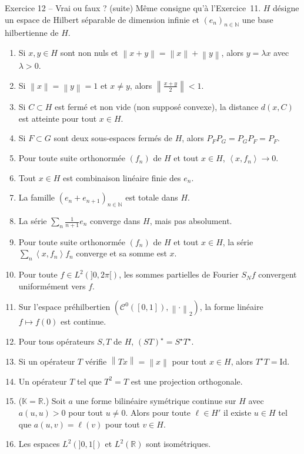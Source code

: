 \documentclass[11pt,a4paper]{article}
\newcommand{\R}{\mathbb{R}}
\newcommand{\N}{\mathbb{N}}
\newcommand{\K}{\mathbb{K}}
\newcommand{\norm}[1]{\left\|#1\right\|}
\newcommand{\ps}[2]{\left\langle #1,#2\right\rangle}
\newcommand{\Cz}{\mathcal{C}^0}
\theoremstyle{definition}
\begin{document}
\begin{exo}{Exercice 12 -- Vrai ou faux ? (suite)}
Même consigne qu'à l'Exercice~11. $H$ désigne un espace de Hilbert séparable de dimension infinie et $(e_n)_{n\in\N}$ une base hilbertienne de $H$.
\begin{enumerate}[label=\arabic*.]
  \item Si $x,y\in H$ sont non nuls et $\norm{x+y}=\norm x+\norm y$, alors $y=\lambda x$ avec $\lambda>0$.
  \item Si $\norm x=\norm y=1$ et $x\ne y$, alors $\norm{\frac{x+y}2}<1$.
  \item Si $C\subset H$ est fermé et non vide (non supposé convexe), la distance $d(x,C)$ est atteinte pour tout $x\in H$.
  \item Si $F\subset G$ sont deux sous-espaces fermés de $H$, alors $P_FP_G=P_GP_F=P_F$.
  \item Pour toute suite orthonormée $(f_n)$ de $H$ et tout $x\in H$, $\ps x{f_n}\to0$.
  \item Tout $x\in H$ est combinaison linéaire finie des $e_n$.
  \item La famille $(e_n+e_{n+1})_{n\in\N}$ est totale dans $H$.
  \item La série $\sum_n\frac1{n+1}e_n$ converge dans $H$, mais pas absolument.
  \item Pour toute suite orthonormée $(f_n)$ de $H$ et tout $x\in H$, la série $\sum_n\ps x{f_n}f_n$ converge et sa somme est $x$.
  \item Pour toute $f\in L^2(]0,2\pi[)$, les sommes partielles de Fourier $S_Nf$ convergent uniformément vers $f$.
  \item Sur l'espace préhilbertien $(\Cz([0,1]),\norm\cdot_2)$, la forme linéaire $f\mapsto f(0)$ est continue.
  \item Pour tous opérateurs $S,T$ de $H$, $(ST)^\star=S^\star T^\star$.
  \item Si un opérateur $T$ vérifie $\norm{Tx}=\norm x$ pour tout $x\in H$, alors $T^\star T=\mathrm{Id}$.
  \item Un opérateur $T$ tel que $T^2=T$ est une projection orthogonale.
  \item ($\K=\R$.) Soit $a$ une forme bilinéaire symétrique continue sur $H$ avec $a(u,u)>0$ pour tout $u\ne0$. Alors pour toute $\ell\in H'$ il existe $u\in H$ tel que $a(u,v)=\ell(v)$ pour tout $v\in H$.
  \item Les espaces $L^2(]0,1[)$ et $L^2(\R)$ sont isométriques.
\end{enumerate}
\end{exo}
\end{document}
